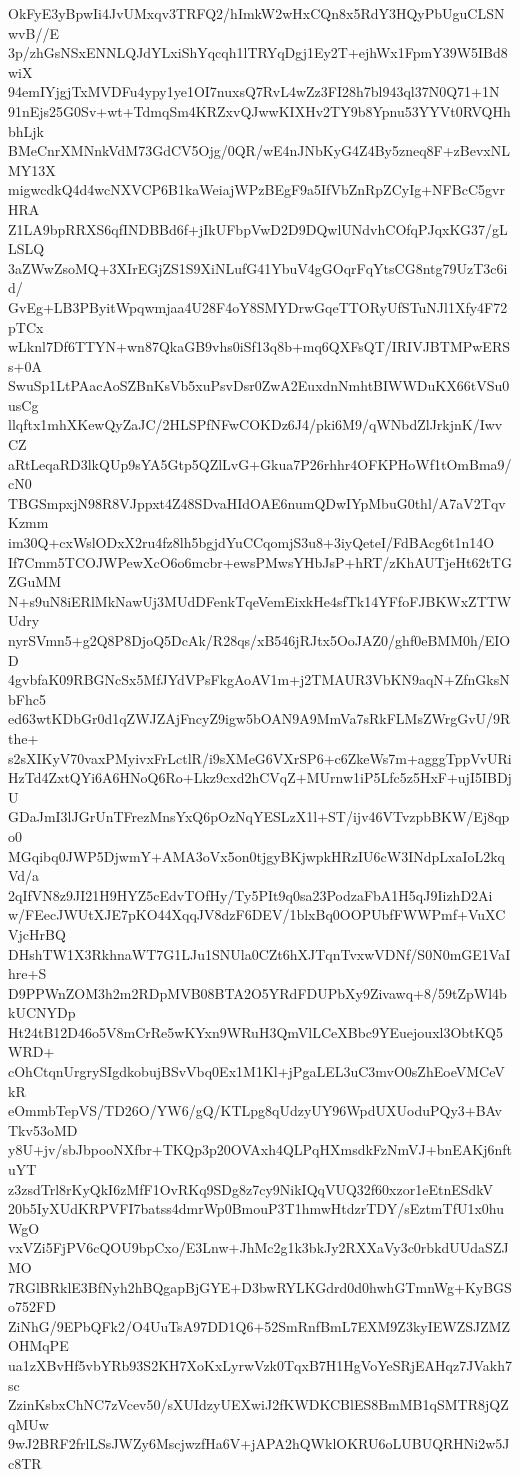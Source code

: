 OkFyE3yBpwIi4JvUMxqv3TRFQ2/hImkW2wHxCQn8x5RdY3HQyPbUguCLSNwvB//E
3p/zhGsNSxENNLQJdYLxiShYqcqh1lTRYqDgj1Ey2T+ejhWx1FpmY39W5IBd8wiX
94emIYjgjTxMVDFu4ypy1ye1OI7nuxsQ7RvL4wZz3FI28h7bl943ql37N0Q71+1N
91nEjs25G0Sv+wt+TdmqSm4KRZxvQJwwKIXHv2TY9b8Ypnu53YYVt0RVQHhbhLjk
BMeCnrXMNnkVdM73GdCV5Ojg/0QR/wE4nJNbKyG4Z4By5zneq8F+zBevxNLMY13X
migwcdkQ4d4wcNXVCP6B1kaWeiajWPzBEgF9a5IfVbZnRpZCyIg+NFBcC5gvrHRA
Z1LA9bpRRXS6qfINDBBd6f+jIkUFbpVwD2D9DQwlUNdvhCOfqPJqxKG37/gLLSLQ
3aZWwZsoMQ+3XIrEGjZS1S9XiNLufG41YbuV4gGOqrFqYtsCG8ntg79UzT3c6id/
GvEg+LB3PByitWpqwmjaa4U28F4oY8SMYDrwGqeTTORyUfSTuNJl1Xfy4F72pTCx
wLknl7Df6TTYN+wn87QkaGB9vhs0iSf13q8b+mq6QXFsQT/IRIVJBTMPwERSs+0A
SwuSp1LtPAacAoSZBnKsVb5xuPsvDsr0ZwA2EuxdnNmhtBIWWDuKX66tVSu0usCg
llqftx1mhXKewQyZaJC/2HLSPfNFwCOKDz6J4/pki6M9/qWNbdZlJrkjnK/IwvCZ
aRtLeqaRD3lkQUp9sYA5Gtp5QZlLvG+Gkua7P26rhhr4OFKPHoWf1tOmBma9/cN0
TBGSmpxjN98R8VJppxt4Z48SDvaHIdOAE6numQDwIYpMbuG0thl/A7aV2TqvKzmm
im30Q+cxWslODxX2ru4fz8lh5bgjdYuCCqomjS3u8+3iyQeteI/FdBAcg6t1n14O
If7Cmm5TCOJWPewXcO6o6mcbr+ewsPMwsYHbJsP+hRT/zKhAUTjeHt62tTGZGuMM
N+s9uN8iERlMkNawUj3MUdDFenkTqeVemEixkHe4sfTk14YFfoFJBKWxZTTWUdry
nyrSVmn5+g2Q8P8DjoQ5DcAk/R28qs/xB546jRJtx5OoJAZ0/ghf0eBMM0h/EIOD
4gvbfaK09RBGNcSx5MfJYdVPsFkgAoAV1m+j2TMAUR3VbKN9aqN+ZfnGksNbFhc5
ed63wtKDbGr0d1qZWJZAjFncyZ9igw5bOAN9A9MmVa7sRkFLMsZWrgGvU/9Rthe+
s2sXIKyV70vaxPMyivxFrLctlR/i9sXMeG6VXrSP6+c6ZkeWs7m+agggTppVvURi
HzTd4ZxtQYi6A6HNoQ6Ro+Lkz9cxd2hCVqZ+MUrnw1iP5Lfc5z5HxF+ujI5IBDjU
GDaJmI3lJGrUnTFrezMnsYxQ6pOzNqYESLzX1l+ST/ijv46VTvzpbBKW/Ej8qpo0
MGqibq0JWP5DjwmY+AMA3oVx5on0tjgyBKjwpkHRzIU6cW3INdpLxaIoL2kqVd/a
2qIfVN8z9JI21H9HYZ5cEdvTOfHy/Ty5PIt9q0sa23PodzaFbA1H5qJ9IizhD2Ai
w/FEecJWUtXJE7pKO44XqqJV8dzF6DEV/1blxBq0OOPUbfFWWPmf+VuXCVjcHrBQ
DHshTW1X3RkhnaWT7G1LJu1SNUla0CZt6hXJTqnTvxwVDNf/S0N0mGE1VaIhre+S
D9PPWnZOM3h2m2RDpMVB08BTA2O5YRdFDUPbXy9Zivawq+8/59tZpWl4bkUCNYDp
Ht24tB12D46o5V8mCrRe5wKYxn9WRuH3QmVlLCeXBbc9YEuejouxl3ObtKQ5WRD+
cOhCtqnUrgrySIgdkobujBSvVbq0Ex1M1Kl+jPgaLEL3uC3mvO0sZhEoeVMCeVkR
eOmmbTepVS/TD26O/YW6/gQ/KTLpg8qUdzyUY96WpdUXUoduPQy3+BAvTkv53oMD
y8U+jv/sbJbpooNXfbr+TKQp3p20OVAxh4QLPqHXmsdkFzNmVJ+bnEAKj6nftuYT
z3zsdTrl8rKyQkI6zMfF1OvRKq9SDg8z7cy9NikIQqVUQ32f60xzor1eEtnESdkV
20b5IyXUdKRPVFI7batss4dmrWp0BmouP3T1hmwHtdzrTDY/sEztmTfU1x0huWgO
vxVZi5FjPV6cQOU9bpCxo/E3Lnw+JhMc2g1k3bkJy2RXXaVy3c0rbkdUUdaSZJMO
7RGlBRklE3BfNyh2hBQgapBjGYE+D3bwRYLKGdrd0d0hwhGTmnWg+KyBGSo752FD
ZiNhG/9EPbQFk2/O4UuTsA97DD1Q6+52SmRnfBmL7EXM9Z3kyIEWZSJZMZOHMqPE
ua1zXBvHf5vbYRb93S2KH7XoKxLyrwVzk0TqxB7H1HgVoYeSRjEAHqz7JVakh7sc
ZzinKsbxChNC7zVcev50/sXUIdzyUEXwiJ2fKWDKCBlES8BmMB1qSMTR8jQZqMUw
9wJ2BRF2frlLSsJWZy6MscjwzfHa6V+jAPA2hQWklOKRU6oLUBUQRHNi2w5Jc8TR
